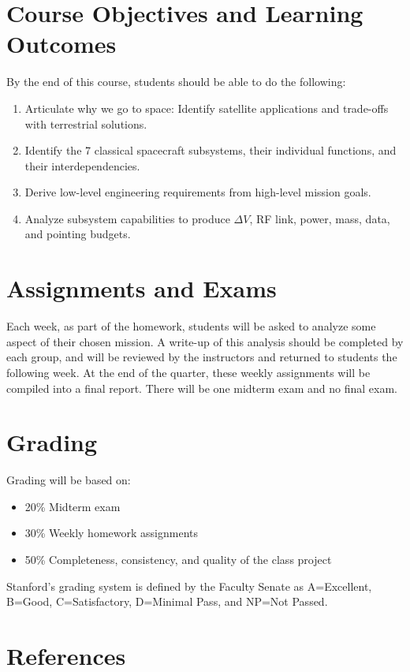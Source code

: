 \documentclass[11pt,letterpaper]{article}
\begin{document}
\section*{Course Objectives and Learning Outcomes}
By the end of this course, students should be able to do the following:
\begin{enumerate}
	\item Articulate why we go to space: Identify satellite applications and trade-offs with terrestrial solutions.
	\item Identify the 7 classical spacecraft subsystems, their individual functions, and their interdependencies.
	\item Derive low-level engineering requirements from high-level mission goals.
	\item Analyze subsystem capabilities to produce $\Delta V$, RF link, power, mass, data, and pointing budgets.
\end{enumerate}

\section*{Assignments and Exams}

Each week, as part of the homework, students will be asked to analyze some aspect of their chosen mission. A write-up of this analysis should be completed by each group, and will be reviewed by the instructors and returned to students the following week. At the end of the quarter, these weekly assignments will be compiled into a final report. There will be one midterm exam and no final exam.

\section*{Grading}

Grading will be based on:
\begin{itemize}
	\item 20\% Midterm exam
	\item 30\% Weekly homework assignments
	\item 50\% Completeness, consistency, and quality of the class project
\end{itemize}
Stanford's grading system is defined by the Faculty Senate as A=Excellent, B=Good, C=Satisfactory, D=Minimal Pass, and NP=Not Passed.

\section*{References}
\end{document}
